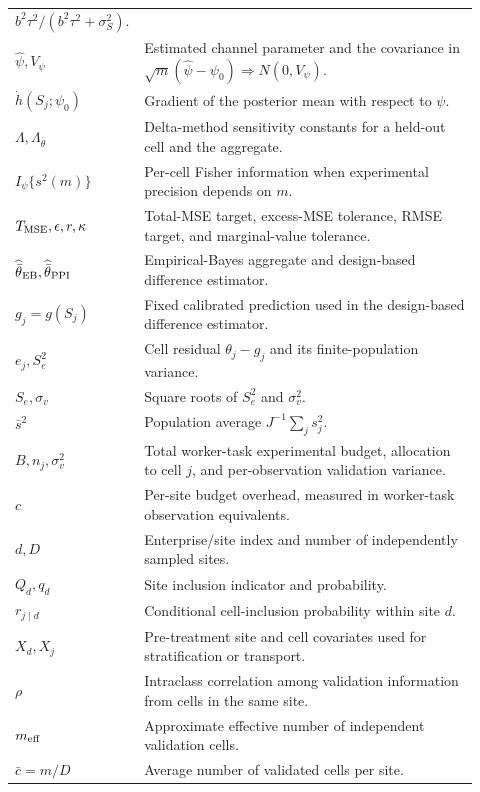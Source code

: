 \documentclass[11pt]{article}
\begin{document}
\begin{longtable}{>{\raggedright\arraybackslash}p{0.23\linewidth}
                  >{\raggedright\arraybackslash}p{0.69\linewidth}}
\(b^2\tau^2/(b^2\tau^2+\sigma_S^2)\). \\
\(\widehat\psi,V_\psi\) & Estimated channel parameter and the covariance in
\(\sqrt m(\widehat\psi-\psi_0)\Rightarrow N(0,V_\psi)\). \\
\(\dot h(S_j;\psi_0)\) & Gradient of the posterior mean with respect to
\(\psi\). \\
\(\Lambda,\Lambda_{\bar\theta}\) & Delta-method sensitivity constants for a
held-out cell and the aggregate. \\
\(I_\psi\{s^2(m)\}\) & Per-cell Fisher information when experimental
precision depends on \(m\). \\
\(T_{\rm MSE},\epsilon,r,\kappa\) & Total-MSE target, excess-MSE tolerance,
RMSE target, and marginal-value tolerance. \\
\(\widehat{\bar\theta}_{\rm EB},
\widehat{\bar\theta}_{\rm PPI}\) & Empirical-Bayes aggregate and design-based
difference estimator. \\
\(g_j=g(S_j)\) & Fixed calibrated prediction used in the design-based
difference estimator. \\
\(e_j,S_e^2\) & Cell residual \(\theta_j-g_j\) and its finite-population
variance. \\
\(S_e,\sigma_v\) & Square roots of \(S_e^2\) and \(\sigma_v^2\). \\
\(\bar s^2\) & Population average \(J^{-1}\sum_js_j^2\). \\
\(B,n_j,\sigma_v^2\) & Total worker-task experimental budget, allocation to
cell \(j\), and per-observation validation variance. \\
\(c\) & Per-site budget overhead, measured in worker-task observation
equivalents. \\
\(d,D\) & Enterprise/site index and number of independently sampled sites. \\
\(Q_d,q_d\) & Site inclusion indicator and probability. \\
\(r_{j\mid d}\) & Conditional cell-inclusion probability within site \(d\). \\
\(X_d,X_j\) & Pre-treatment site and cell covariates used for stratification
or transport. \\
\(\rho\) & Intraclass correlation among validation information from cells in
the same site. \\
\(m_{\rm eff}\) & Approximate effective number of independent validation
cells. \\
\(\bar c=m/D\) & Average number of validated cells per site. \\
\bottomrule
\end{longtable}
\end{document}
